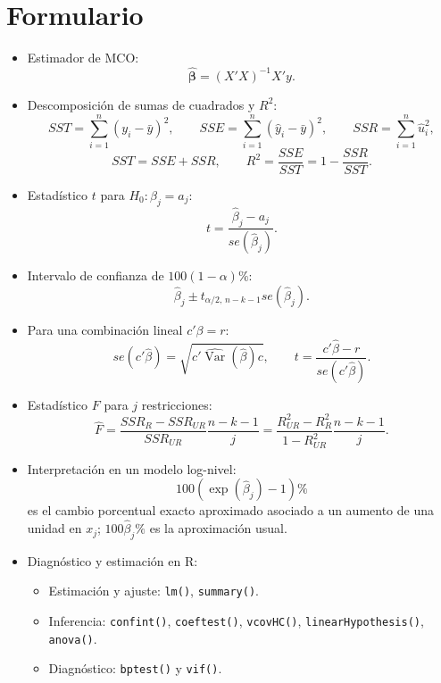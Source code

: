 \documentclass[letterpaper,11pt]{article}
\begin{document}
\newpage
\section{Formulario}

\begin{itemize}
    \item Estimador de MCO:
    \[
        \widehat{\boldsymbol\beta}=(X'X)^{-1}X'y.
    \]

    \item Descomposición de sumas de cuadrados y $R^2$:
    \[
        SST=\sum_{i=1}^{n}(y_i-\bar y)^2,\qquad
        SSE=\sum_{i=1}^{n}(\widehat y_i-\bar y)^2,\qquad
        SSR=\sum_{i=1}^{n}\widehat u_i^2,
    \]
    \[
        SST=SSE+SSR,\qquad
        R^2=\frac{SSE}{SST}=1-\frac{SSR}{SST}.
    \]

    \item Estadístico $t$ para $H_0:\beta_j=a_j$:
    \[
        t=\frac{\widehat\beta_j-a_j}{se(\widehat\beta_j)}.
    \]

    \item Intervalo de confianza de $100(1-\alpha)\%$:
    \[
        \widehat\beta_j\pm t_{\alpha/2,\,n-k-1}
        se(\widehat\beta_j).
    \]

    \item Para una combinación lineal $c'\beta=r$:
    \[
        se(c'\widehat\beta)
        =\sqrt{c'\widehat{\operatorname{Var}}(\widehat\beta)c},
        \qquad
        t=\frac{c'\widehat\beta-r}{se(c'\widehat\beta)}.
    \]

    \item Estadístico $F$ para $j$ restricciones:
    \[
        \widehat F
        =\frac{SSR_R-SSR_{UR}}{SSR_{UR}}\frac{n-k-1}{j}
        =\frac{R^2_{UR}-R^2_R}{1-R^2_{UR}}\frac{n-k-1}{j}.
    \]

    \item Interpretación en un modelo log-nivel:
    \[
        100\left(\exp(\widehat\beta_j)-1\right)\% 
    \]
    es el cambio porcentual exacto aproximado asociado a un aumento de una
    unidad en $x_j$; $100\widehat\beta_j\%$ es la aproximación usual.

    \item Diagnóstico y estimación en R:
    \begin{itemize}[noitemsep]
        \item Estimación y ajuste: \texttt{lm()}, \texttt{summary()}.
        \item Inferencia: \texttt{confint()}, \texttt{coeftest()},
              \texttt{vcovHC()}, \texttt{linearHypothesis()},
              \texttt{anova()}.
        \item Diagnóstico: \texttt{bptest()} y \texttt{vif()}.
    \end{itemize}
\end{itemize}
\end{document}
